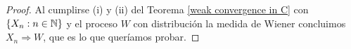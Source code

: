 \documentclass[12pt, letterpaper]{article}
\numberwithin{equation}{section}
\begin{document}
\begin{proof}
    Al cumplirse (i) y (ii) del Teorema \ref{weak convergence in C} con $\{X_n:n\in\N\}$ y el proceso $W$ con distribución la medida de Wiener concluimos $X_n\Rightarrow W$, que es lo que queríamos probar. 
\end{proof}
\newpage
\nocite{*}
\printbibliography
\end{document}
